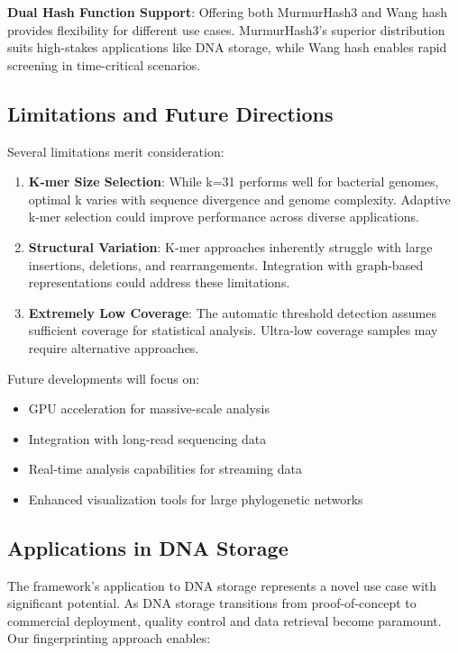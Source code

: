 \documentclass[12pt,a4paper]{article}
\begin{document}
\textbf{Dual Hash Function Support}: Offering both MurmurHash3 and Wang hash provides flexibility for different use cases. MurmurHash3's superior distribution suits high-stakes applications like DNA storage, while Wang hash enables rapid screening in time-critical scenarios.

\subsection{Limitations and Future Directions}

Several limitations merit consideration:

\begin{enumerate}
\item \textbf{K-mer Size Selection}: While k=31 performs well for bacterial genomes, optimal k varies with sequence divergence and genome complexity. Adaptive k-mer selection could improve performance across diverse applications.

\item \textbf{Structural Variation}: K-mer approaches inherently struggle with large insertions, deletions, and rearrangements. Integration with graph-based representations could address these limitations.

\item \textbf{Extremely Low Coverage}: The automatic threshold detection assumes sufficient coverage for statistical analysis. Ultra-low coverage samples may require alternative approaches.
\end{enumerate}

Future developments will focus on:
\begin{itemize}
\item GPU acceleration for massive-scale analysis
\item Integration with long-read sequencing data
\item Real-time analysis capabilities for streaming data
\item Enhanced visualization tools for large phylogenetic networks
\end{itemize}

\subsection{Applications in DNA Storage}

The framework's application to DNA storage represents a novel use case with significant potential. As DNA storage transitions from proof-of-concept to commercial deployment, quality control and data retrieval become paramount. Our fingerprinting approach enables:
\end{document}
